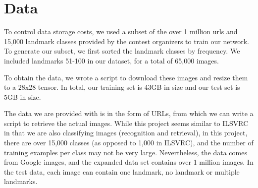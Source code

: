 \section{Data}
To control data storage costs, we used a subset of the over 1 million urls and 15,000 landmark classes provided by the contest organizers to train our network. To generate our subset, we first sorted the landmark classes by frequency. We included landmarks 51-100 in our dataset, for a total of 65,000 images.

To obtain the data, we wrote a script to download these images and resize them to a 28x28 tensor. In total, our training set is 43GB in size and our test set is 5GB in size. 

The data we are provided with is in the form of URLs, from which we can write a script to retrieve the actual images. While this project seems similar to ILSVRC in that we are also classifying images (recognition and retrieval), in this project, there are over 15,000 classes (as opposed to 1,000 in ILSVRC), and the number of training examples per class may not be very large. Nevertheless, the data comes from Google images, and the expanded data set contains over 1 million images. In the test data, each image can contain one landmark, no landmark or multiple landmarks.